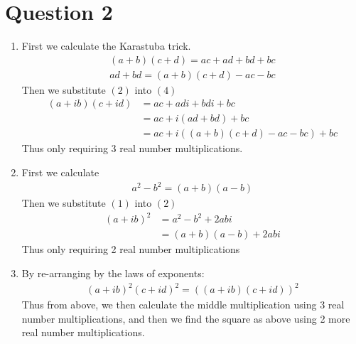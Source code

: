 \documentclass{article}
\begin{document}
\section*{Question 2}
\begin{enumerate}[label=\alph*)]
    \item
        First we calculate the Karastuba trick.
        \setcounter{equation}{0}
        \begin{gather}
            (a + b)(c + d) = ac + ad + bd + bc \\
            ad + bd = (a + b)(c + d) - ac - bc
        \end{gather}
        Then we substitute $(2)$ into $(4)$
        \begin{align}
            (a + ib)(c + id) &= ac + adi + bdi + bc \\
            &= ac + i(ad + bd) + bc \\
            &= ac + i((a + b)(c + d) - ac - bc) + bc
        \end{align}
        Thus only requiring 3 real number multiplications.
    \item
        \setcounter{equation}{0}
        First we calculate
        \begin{gather}
            a^2 - b^2 = (a + b)(a - b)
        \end{gather}
        Then we substitute $(1)$ into $(2)$
        \begin{align}
            (a + ib)^2 &= a^2 - b^2 + 2abi\\
            &= (a + b)(a - b) + 2abi
        \end{align}
        Thus only requiring 2 real number multiplications
    \item
        \setcounter{equation}{0}
        By re-arranging by the laws of exponents:
        \begin{gather*}
            (a+ib)^2(c+id)^2 = ((a+ib)(c+id))^2
        \end{gather*}
        Thus from above, we then calculate the middle multiplication using
        3 real number multiplications, and then we find the square as above
        using 2 more real number multiplications.
\end{enumerate}
\end{document}
